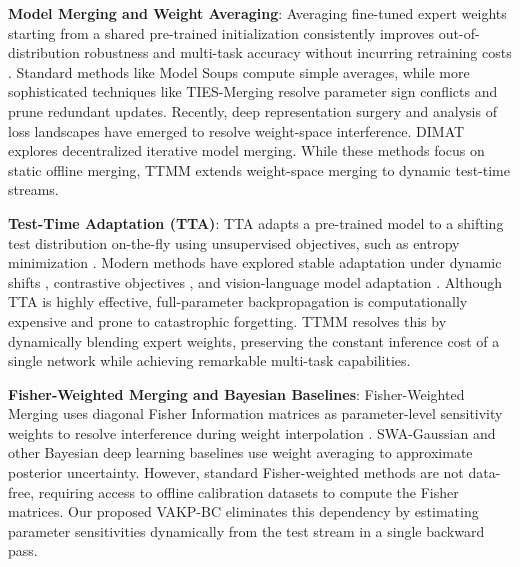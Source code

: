 \documentclass{article}
\theoremstyle{plain}
\theoremstyle{definition}
\theoremstyle{remark}
\begin{document}
\textbf{Model Merging and Weight Averaging}: Averaging fine-tuned expert weights starting from a shared pre-trained initialization consistently improves out-of-distribution robustness and multi-task accuracy without incurring retraining costs \cite{wortsman2022robust, ilharco2022editing, stochasticweightaveraging2022, improvinglearningwith2018}. Standard methods like Model Soups compute simple averages, while more sophisticated techniques like TIES-Merging \cite{ties_merging} resolve parameter sign conflicts and prune redundant updates. Recently, deep representation surgery \cite{surgeryv2bridgingbetween2024} and analysis of loss landscapes \cite{findingcommonground2024} have emerged to resolve weight-space interference. DIMAT \cite{dimatdecentralizediterative2024} explores decentralized iterative model merging. While these methods focus on static offline merging, TTMM \cite{yang2024test, hubotter2025local} extends weight-space merging to dynamic test-time streams.

\textbf{Test-Time Adaptation (TTA)}: TTA adapts a pre-trained model to a shifting test distribution on-the-fly using unsupervised objectives, such as entropy minimization \cite{wang2021tent, tentfullyadaptation2021}. Modern methods have explored stable adaptation under dynamic shifts \cite{towardsstableadaptation2023, robustadaptationdynamic2023}, contrastive objectives \cite{contrastiveadaptation2022}, and vision-language model adaptation \cite{efficientadaptationmodels2024, ecottacontinualadaptation2023}. Although TTA is highly effective, full-parameter backpropagation is computationally expensive and prone to catastrophic forgetting. TTMM resolves this by dynamically blending expert weights, preserving the constant inference cost of a single network while achieving remarkable multi-task capabilities.

\textbf{Fisher-Weighted Merging and Bayesian Baselines}: Fisher-Weighted Merging uses diagonal Fisher Information matrices as parameter-level sensitivity weights to resolve interference during weight interpolation \cite{matena2022merging}. SWA-Gaussian \cite{simplebaselinebayesian2019} and other Bayesian deep learning baselines \cite{bayesiandeeplearning2022} use weight averaging to approximate posterior uncertainty. However, standard Fisher-weighted methods are not data-free, requiring access to offline calibration datasets to compute the Fisher matrices. Our proposed VAKP-BC eliminates this dependency by estimating parameter sensitivities dynamically from the test stream in a single backward pass.
\end{document}

